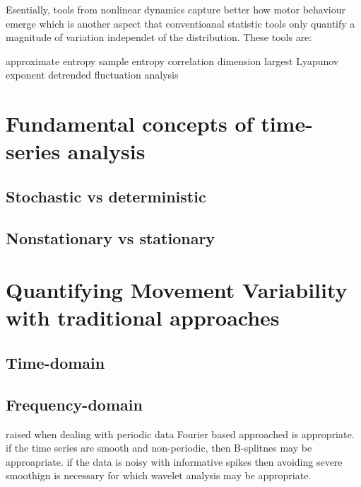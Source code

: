 Esentially, 
tools from nonlinear dynamics
capture better how motor behaviour emerge which is
another aspect that conventioanal statistic tools only 
quantify a magnitude of variation independet of the 
distribution.
These tools are:

approximate entropy
sample entropy
correlation dimension
largest Lyapunov exponent
detrended fluctuation analysis



\section{Fundamental concepts of time-series analysis}
\subsection{Stochastic vs deterministic}
\subsection{Nonstationary vs stationary}




\section{Quantifying Movement Variability with traditional approaches}
\subsection{Time-domain}
\subsection{Frequency-domain}


\cite{preatoni2013} raised 
when dealing with periodic data
Fourier based approached is appropriate.
if the time series are smooth and non-periodic, then 
B-splitnes may be approapriate.
if the data is noisy with informative spikes 
then avoiding severe smoothign is necessary for which 
wavelet analysis may be appropriate.


